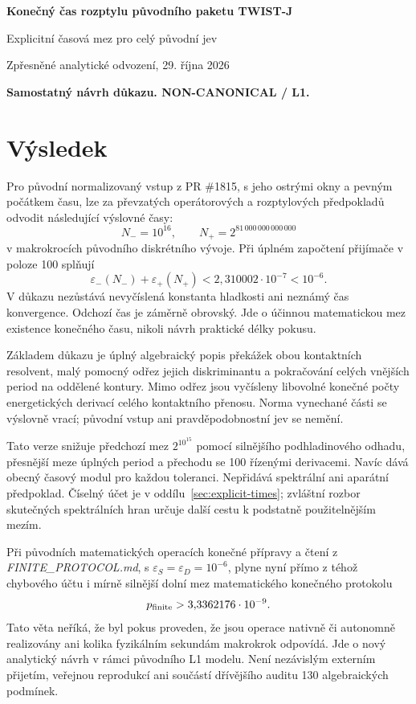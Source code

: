 \documentclass[11pt,a4paper]{article}
\newcommand{\eps}{\varepsilon}
\theoremstyle{remark}\newtheorem{remark}[theorem]{Poznámka}
\numberwithin{equation}{section}
\begin{document}
\thispagestyle{empty}
{\Large\sffamily\bfseries Konečný čas rozptylu původního paketu TWIST-J\par}
\vspace{3mm}
{\large Explicitní časová mez pro celý původní jev\par}
\vspace{4mm}
Zpřesněné analytické odvození, 29. října 2026\par
\textbf{Samostatný návrh důkazu. NON-CANONICAL / L1.}

\section*{Výsledek}

Pro původní normalizovaný vstup z PR \#1815, s jeho ostrými okny a pevným počátkem času, lze za převzatých operátorových a rozptylových předpokladů odvodit následující výslovné časy:
\[
\boxed{N_-=10^{16},\qquad N_+=2^{81\,000\,000\,000\,000}}
\]
v makrokrocích původního diskrétního vývoje. Při úplném započtení přijímače v poloze 100 splňují
\[
\boxed{\eps_-(N_-)+\eps_+(N_+)
<2{,}310002\cdot10^{-7}<10^{-6}.}
\]
V důkazu nezůstává nevyčíslená konstanta hladkosti ani neznámý čas konvergence. Odchozí čas je záměrně obrovský. Jde o účinnou matematickou mez existence konečného času, nikoli návrh praktické délky pokusu.

Základem důkazu je úplný algebraický popis překážek obou kontaktních resolvent, malý pomocný odřez jejich diskriminantu a pokračování celých vnějších period na oddělené kontury. Mimo odřez jsou vyčísleny libovolné konečné počty energetických derivací celého kontaktního přenosu. Norma vynechané části se výslovně vrací; původní vstup ani pravděpodobnostní jev se nemění.

Tato verze snižuje předchozí mez \(2^{10^{15}}\) pomocí silnějšího podhladinového odhadu, přesnější meze úplných period a přechodu se 100 řízenými derivacemi. Navíc dává obecný časový modul pro každou toleranci. Nepřidává spektrální ani aparátní předpoklad. Číselný účet je v oddílu~\ref{sec:explicit-times}; zvláštní rozbor skutečných spektrálních hran určuje další cestu k podstatně použitelnějším mezím.

Při původních matematických operacích konečné přípravy a čtení z \textit{FINITE\_PROTOCOL.md}, s \(\eps_S=\eps_D=10^{-6}\), plyne nyní přímo z téhož chybového účtu i mírně silnější dolní mez matematického konečného protokolu
\[
p_{\rm finite}>3{,}3362176\cdot10^{-9}.
\]
Tato věta neříká, že byl pokus proveden, že jsou operace nativně či autonomně realizovány ani kolika fyzikálním sekundám makrokrok odpovídá. Jde o nový analytický návrh v rámci původního L1 modelu. Není nezávislým externím přijetím, veřejnou reprodukcí ani součástí dřívějšího auditu 130 algebraických podmínek.
\end{document}
